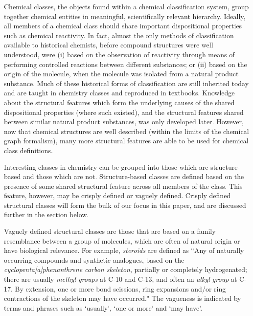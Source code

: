 \documentclass[10pt]{bmc_article}
\newenvironment{bmcformat}{\baselineskip20pt\sloppy\setboolean{publ}{false}}{\baselineskip20pt\sloppy}
\begin{document}
\begin{bmcformat}
Chemical classes, the objects found within a chemical classification system, group together chemical entities in meaningful, scientifically relevant hierarchy. Ideally, all members of a chemical class should share important dispositional properties such as chemical reactivity. In fact, almost the only methods of classification available to historical chemists, before compound structures were well understood, were (i) based on the observation of reactivity through means of performing controlled reactions between different substances; or (ii) based on the origin of the molecule, when the molecule was isolated from a natural product substance. Much of these historical forms of classification are still inherited today and are taught in chemistry classes and reproduced in textbooks. Knowledge about the structural features which form the underlying causes of the shared dispositional properties (where such existed), and the structural features shared between similar natural product substances, was only developed later. However, now that chemical structures are well described (within the limits of the chemical graph formalism), many more structural features are able to be used for chemical class definitions. 

Interesting classes in chemistry can be grouped into those which are structure-based and those which are not. Structure-based classes are defined based on the presence of some shared structural feature across all members of the class.  This feature, however, may be crisply defined or vaguely defined.  Crisply defined structural classes will form the bulk of our focus in this paper, and are discussed further in the section \textit{} below.   

Vaguely defined structural classes are those that are based on a family resemblance between a group of molecules, which are often of natural origin or have biological relevance.  For example, \textit{steroids} are defined as ``Any of naturally occurring compounds and synthetic analogues, based on the \textit{cyclopenta[a]phenanthrene carbon skeleton}, partially or completely hydrogenated; there are usually \textit{methyl groups} at C-10 and C-13, and often an \textit{alkyl group} at C-17. By extension, one or more bond scissions, ring expansions and/or ring contractions of the skeleton may have occurred."  The vagueness is indicated by terms and phrases such as `usually', `one or more' and `may have'.


\end{bmcformat}
\end{document}
